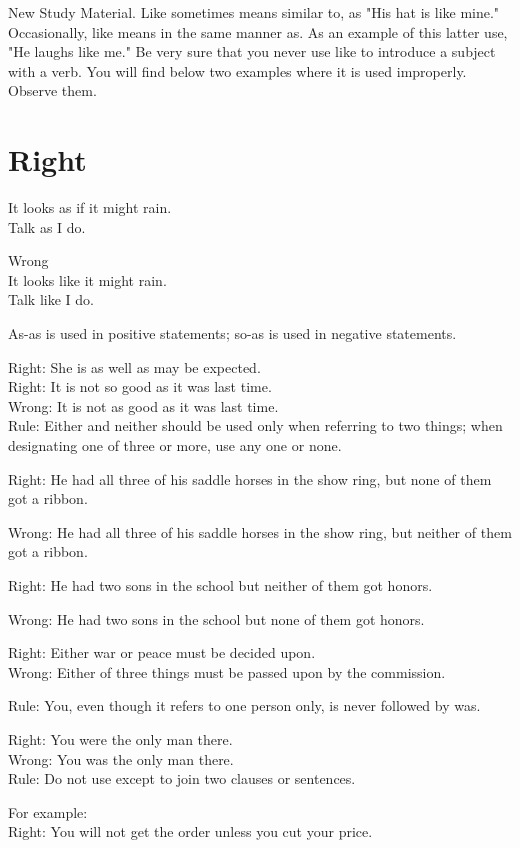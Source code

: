 \documentclass[10pt]{article}
\begin{document}
New Study Material. Like sometimes means similar to, as "His hat is like mine." Occasionally, like means in the same manner as. As an example of this latter use, "He laughs like me." Be very sure that you never use like to introduce a subject with a verb. You will find below two examples where it is used improperly. Observe them.

\section*{Right}
It looks as if it might rain.\\
Talk as I do.

Wrong\\
It looks like it might rain.\\
Talk like I do.

As-as is used in positive statements; so-as is used in negative statements.

Right: She is as well as may be expected.\\
Right: It is not so good as it was last time.\\
Wrong: It is not as good as it was last time.\\
Rule: Either and neither should be used only when referring to two things; when designating one of three or more, use any one or none.

Right: He had all three of his saddle horses in the show ring, but none of them got a ribbon.

Wrong: He had all three of his saddle horses in the show ring, but neither of them got a ribbon.

Right: He had two sons in the school but neither of them got honors.

Wrong: He had two sons in the school but none of them got honors.

Right: Either war or peace must be decided upon.\\
Wrong: Either of three things must be passed upon by the commission.

Rule: You, even though it refers to one person only, is never followed by was.

Right: You were the only man there.\\
Wrong: You was the only man there.\\
Rule: Do not use except to join two clauses or sentences.

For example:\\
Right: You will not get the order unless you cut your price.
\end{document}
